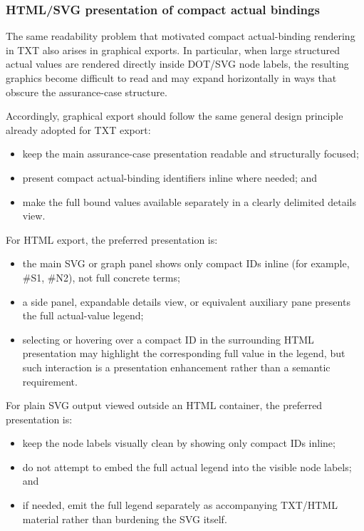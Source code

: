 \subsubsection{HTML/SVG presentation of compact actual bindings}

The same readability problem that motivated compact actual-binding rendering in TXT
also arises in graphical exports. In particular, when large structured actual values are
rendered directly inside DOT/SVG node labels, the resulting graphics become difficult
to read and may expand horizontally in ways that obscure the assurance-case structure.

Accordingly, graphical export should follow the same general design principle already
adopted for TXT export:

\begin{itemize}
\item keep the main assurance-case presentation readable and structurally focused;
\item present compact actual-binding identifiers inline where needed; and
\item make the full bound values available separately in a clearly delimited details view.
\end{itemize}

For HTML export, the preferred presentation is:

\begin{itemize}
\item the main SVG or graph panel shows only compact IDs inline (for example, \#S1, \#N2),
not full concrete terms;
\item a side panel, expandable details view, or equivalent auxiliary pane presents the full
actual-value legend;
\item selecting or hovering over a compact ID in the surrounding HTML presentation may
highlight the corresponding full value in the legend, but such interaction is a presentation
enhancement rather than a semantic requirement.
\end{itemize}

For plain SVG output viewed outside an HTML container, the preferred presentation is:

\begin{itemize}
\item keep the node labels visually clean by showing only compact IDs inline;
\item do not attempt to embed the full actual legend into the visible node labels; and
\item if needed, emit the full legend separately as accompanying TXT/HTML material rather
than burdening the SVG itself.
\end{itemize}

